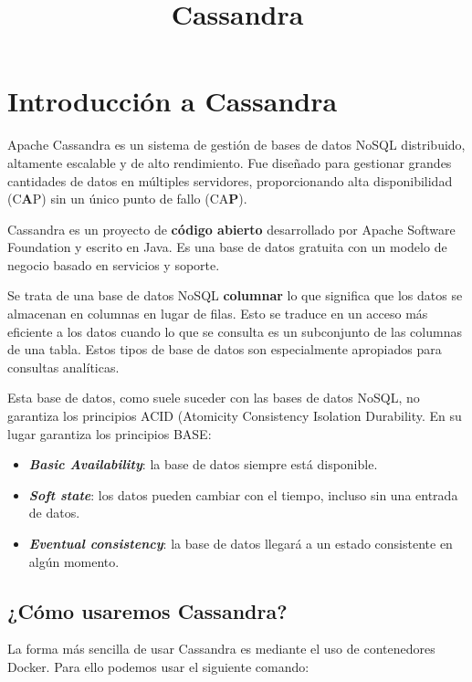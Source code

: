 \documentclass[
]{book}
\title{Cassandra}
\author{}
\date{}
\providecommand{\tightlist}{%
  \setlength{\itemsep}{0pt}\setlength{\parskip}{0pt}}
\begin{document}
\frontmatter
\maketitle

\mainmatter
\section{Introducción a Cassandra}\label{introducciuxf3n-a-cassandra}

Apache Cassandra es un sistema de gestión de bases de datos NoSQL distribuido, altamente escalable y de alto rendimiento. Fue diseñado para gestionar grandes cantidades de datos en múltiples servidores, proporcionando alta disponibilidad (C\textbf{A}P) sin un único punto de fallo (CA\textbf{P}).

Cassandra es un proyecto de \textbf{código abierto} desarrollado por Apache Software Foundation y escrito en Java. Es una base de datos gratuita con un modelo de negocio basado en servicios y soporte.

Se trata de una base de datos NoSQL \textbf{columnar} lo que significa que los datos se almacenan en columnas en lugar de filas. Esto se traduce en un acceso más eficiente a los datos cuando lo que se consulta es un subconjunto de las columnas de una tabla. Estos tipos de base de datos son especialmente apropiados para consultas analíticas.

Esta base de datos, como suele suceder con las bases de datos NoSQL, no garantiza los principios ACID (Atomicity Consistency Isolation Durability. En su lugar garantiza los principios BASE:

\begin{itemize}
\tightlist
\item
  \textbf{\emph{Basic Availability}}: la base de datos siempre está disponible.
\item
  \textbf{\emph{Soft state}}: los datos pueden cambiar con el tiempo, incluso sin una entrada de datos.
\item
  \textbf{\emph{Eventual consistency}}: la base de datos llegará a un estado consistente en algún momento.
\end{itemize}

\subsection{¿Cómo usaremos Cassandra?}\label{cuxf3mo-usaremos-cassandra}

La forma más sencilla de usar Cassandra es mediante el uso de contenedores Docker. Para ello podemos usar el siguiente comando:
\end{document}
